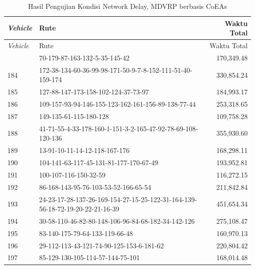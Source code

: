 \begin{longtable}[!]{lp{8cm}r}
	\caption{Hasil Pengujian Kondisi Network Delay, MDVRP berbasis CoEAs}
	\label{tbl:test_result_network_delay_field_coes}\\
	\toprule
	\textit{Vehicle} & Rute & Waktu Total\\ 
	\midrule
	\endfirsthead
	\toprule
	\textit{Vehicle} & Rute & Waktu Total\\ 
	\midrule
	\endhead
	\bottomrule
	\endfoot
	183 & 70-179-87-163-132-5-35-145-42 & 170,349.48 \\
	184 & 172-38-134-60-36-99-98-171-50-9-7-8-152-111-51-40-159-174 & 330,854.24 \\
	185 & 127-88-147-173-158-102-124-37-73-97 & 184,993.17 \\
	186 & 109-157-93-94-146-155-123-162-161-156-89-138-77-44 & 253,318.65 \\
	187 & 149-135-61-115-180-128 & 109,758.28 \\
	188 & 41-71-55-4-33-178-160-1-151-3-2-165-47-92-78-69-108-120-136 & 355,930.60 \\
	189 & 13-91-10-11-14-12-118-167-176 & 168,298.11 \\
	190 & 104-141-63-117-45-131-81-177-170-67-49 & 193,952.81 \\
	191 & 100-107-116-150-32-59 & 116,272.15 \\
	192 & 86-168-143-95-76-103-53-52-166-65-54 & 211,842.84 \\
	193 & 24-23-17-28-137-26-169-154-27-15-25-122-31-164-139-56-18-72-19-20-22-21-16-39 & 451,654.34 \\
	194 & 30-58-110-46-82-80-148-106-96-84-68-182-34-142-126 & 275,108.47 \\
	195 & 83-140-175-79-64-133-119-66-48 & 160,970.13 \\
	196 & 29-112-113-43-121-74-90-125-153-6-181-62 & 220,804.42 \\
	197 & 85-129-130-105-114-57-144-75-101 & 168,014.48 \\
\end{longtable}


